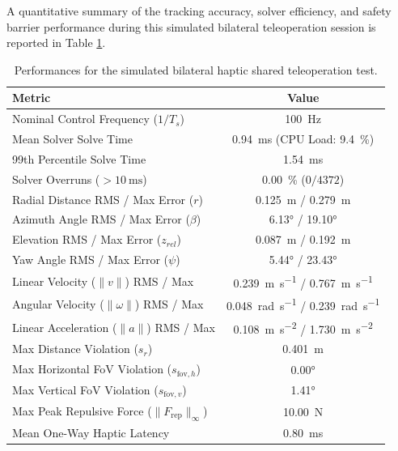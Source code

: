A quantitative summary of the tracking accuracy, solver efficiency, and safety barrier performance during this simulated bilateral teleoperation session is reported in Table \ref{tab:sim_haptic_metrics}.

\begin{table}[htbp]
\centering
\small
\caption{Performances for the simulated bilateral haptic shared teleoperation test.}
\label{tab:sim_haptic_metrics}
\begin{tabular}{lc}
\toprule
\textbf{Metric} & \textbf{Value} \\
\midrule
Nominal Control Frequency ($1/T_s$) & \SI{100}{\hertz} \\
Mean Solver Solve Time & \SI{0.94}{\milli\second} (CPU Load: \SI{9.4}{\percent}) \\
99th Percentile Solve Time & \SI{1.54}{\milli\second} \\
Solver Overruns ($> \SI{10}{\milli\second}$) & \SI{0.00}{\percent} ($0 / 4372$) \\
\midrule
Radial Distance RMS / Max Error ($r$) & \SI{0.125}{\meter} / \SI{0.279}{\meter} \\
Azimuth Angle RMS / Max Error ($\beta$) & \ang{6.13} / \ang{19.10} \\
Elevation RMS / Max Error ($z_{rel}$) & \SI{0.087}{\meter} / \SI{0.192}{\meter} \\
Yaw Angle RMS / Max Error ($\psi$) & \ang{5.44} / \ang{23.43} \\
\midrule
Linear Velocity ($\|v\|$) RMS / Max & \SI{0.239}{\meter\per\second} / \SI{0.767}{\meter\per\second} \\
Angular Velocity ($\|\omega\|$) RMS / Max & \SI{0.048}{\radian\per\second} / \SI{0.239}{\radian\per\second} \\
Linear Acceleration ($\|a\|$) RMS / Max & \SI{0.108}{\meter\per\second\squared} / \SI{1.730}{\meter\per\second\squared} \\
\midrule
Max Distance Violation ($s_r$) & \SI{0.401}{\meter} \\
Max Horizontal FoV Violation ($s_{\text{fov},h}$) & \ang{0.00} \\
Max Vertical FoV Violation ($s_{\text{fov},v}$) & \ang{1.41} \\
Max Peak Repulsive Force ($\|F_{\text{rep}}\|_{\infty}$) & \SI{10.00}{\newton} \\
Mean One-Way Haptic Latency & \SI{0.80}{\milli\second} \\
\bottomrule
\end{tabular}
\end{table}

